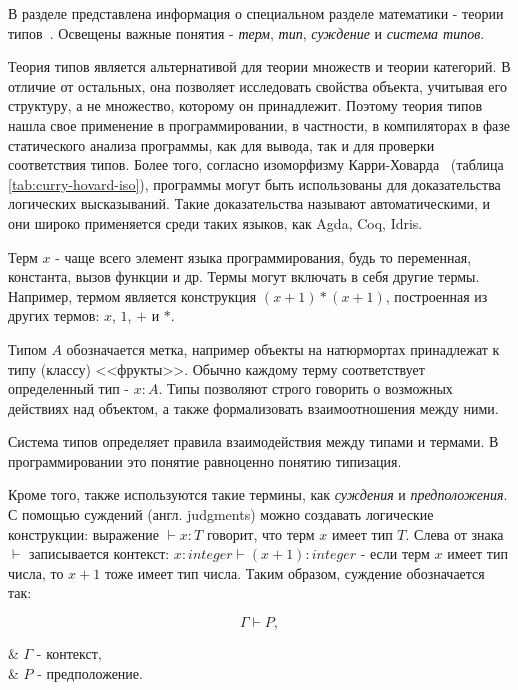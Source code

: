 В разделе представлена информация о специальном разделе математики - теории типов~\cite{TypeTheoryBook}.
Освещены важные понятия - \textit{терм}, \textit{тип}, \textit{суждение} и \textit{система типов}.

Теория типов является альтернативой для теории множеств и теории категорий.
В отличие от остальных, она позволяет исследовать свойства объекта, учитывая его структуру, а не множество, которому он принадлежит.
Поэтому теория типов нашла свое применение в программировании, в частности, в компиляторах в фазе статического анализа программы, как для вывода, так и для проверки соответствия типов.
Более того, согласно изоморфизму Карри-Ховарда~\cite{TypeTheoryArticle} (таблица \ref{tab:curry-hovard-iso}), программы могут быть использованы для доказательства логических высказываний.
Такие доказательства называют автоматическими, и они широко применяется среди таких языков, как Agda, Coq, Idris.

Терм $x$ - чаще всего элемент языка программирования, будь то переменная, константа, вызов функции и др.
Термы могут включать в себя другие термы.
Например, термом является конструкция $(x + 1) * (x + 1)$, построенная из других термов: $x$, $1$, $+$ и $*$.

Типом $A$ обозначается метка, например объекты на натюрмортах принадлежат к типу (классу) <<фрукты>>.
Обычно каждому терму соответствует определенный тип - $x: A$.
Типы позволяют строго говорить о возможных действиях над объектом, а также формализовать взаимоотношения между ними.

Система типов определяет правила взаимодействия между типами и термами.
В программировании это понятие равноценно понятию типизация.

Кроме того, также используются такие термины, как \textit{суждения} и \textit{предположения}.
С помощью суждений (англ. judgments) можно создавать логические конструкции: выражение $\vdash x: T$ говорит, что терм $x$ имеет тип $T$.
Слева от знака $\vdash$ записывается контекст: $x: integer \vdash (x + 1): integer$ - если терм $x$ имеет тип числа, то $x + 1$ тоже имеет тип числа.
Таким образом, суждение обозначается так:

\begin{equation}
    \Gamma \vdash P,
    \label{eq:judgment}
\end{equation}
\begin{eqrem}
    & $\Gamma$ - контекст, \\
    & $P$ - предположение. \\
\end{eqrem}


